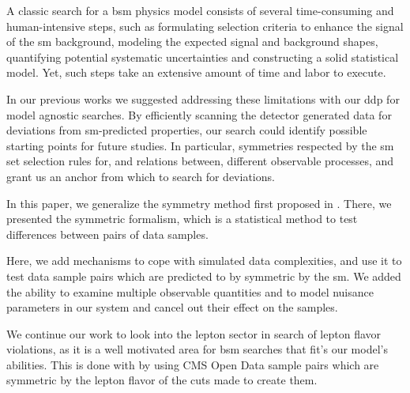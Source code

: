 \documentclass[../ddppaper2.tex]{subfiles}
\begin{document}
A classic search for a \gls{bsm} physics model \cite{ATLAS_Higgs_2012} consists of several time-consuming and human-intensive steps, such as formulating selection criteria to enhance the signal of the \gls{sm} background, modeling the expected signal and background shapes, quantifying potential systematic uncertainties and constructing a solid statistical model. Yet, such steps take an extensive amount of time and labor to execute. 

In our previous works \cite{Volkovich_2022_DDP, Birman_2022_Symmetries, LastDDPPaper} we suggested addressing these limitations with our \gls{ddp} for model agnostic searches. By efficiently scanning the detector generated data for deviations from \gls{sm}-predicted properties, our search could identify possible starting points for future studies. In particular, symmetries respected by the \gls{sm} set selection rules for, and relations between, different observable processes, and grant us an anchor from which to search for deviations. 

In this paper, we generalize the symmetry method first proposed in \cite{LastDDPPaper}. There, we presented the symmetric formalism, which is a statistical method to test differences between pairs of data samples.

Here, we add mechanisms to cope with simulated data complexities, and use it to test data sample pairs which are predicted to by symmetric by the \gls{sm}. We added the ability to examine multiple observable quantities and to model nuisance parameters in our system and cancel out their effect on the samples.

We continue our work to look into the lepton sector in search of lepton flavor violations, as it is a well motivated area for \gls{bsm} searches that fit's our model's abilities. This is done with by using CMS Open Data sample pairs which are symmetric by the lepton flavor of the cuts made to create them.
\end{document}
